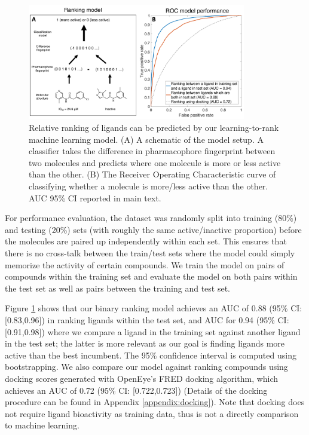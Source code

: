 \begin{figure}
    \centering
    \includegraphics[width=0.85\textwidth]{Chapters/Ranking/Figs/ranking-model.pdf}
    \caption{Relative ranking of ligands can be predicted by our learning-to-rank machine learning model. (A) A schematic of the model setup. A classifier takes the difference in pharmacophore fingerprint between two molecules and predicts where one molecule is more or less active than the other. (B) The Receiver Operating Characteristic curve of classifying whether a molecule is more/less active than the other. AUC 95\% CI reported in main text.}
    \label{fig:roc_plot}
\end{figure}

For performance evaluation, the dataset was randomly split into training (80\%) and testing (20\%) sets (with roughly the same active/inactive proportion) before the molecules are paired up independently within each set. This ensures that there is no cross-talk between the train/test sets where the model could simply memorize the activity of certain compounds. We train the model on pairs of compounds within the training set and evaluate the model on both pairs within the test set as well as pairs between the training and test set.

Figure \ref{fig:roc_plot} shows that our binary ranking model achieves an AUC of 0.88 (95\% CI: [0.83,0.96]) in ranking ligands within the test set, and AUC for 0.94 (95\% CI: [0.91,0.98]) where we compare a ligand in the training set against another ligand in the test set; the latter is more relevant as our goal is finding ligands more active than the best incumbent. The 95\% confidence interval is computed using bootstrapping. We also compare our model against ranking compounds using docking scores generated with OpenEye's FRED docking algorithm, which achieves an AUC of 0.72 (95\% CI: [0.722,0.723]) (Details of the docking procedure can be found in Appendix \ref{appendix:docking}). Note that docking does not require ligand bioactivity as training data, thus is not a directly comparison to machine learning. 

